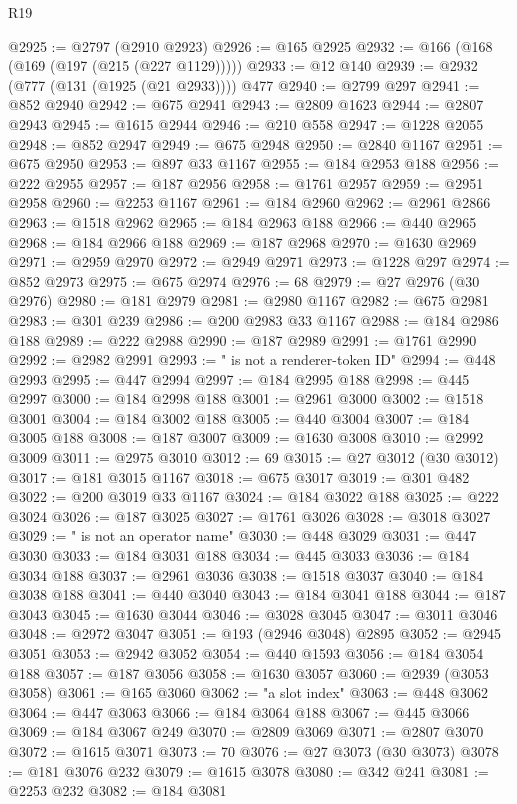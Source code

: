 \begin{lexlean}{R19}
\begin{coremodule}
@2925 := @2797 (@2910 @2923)
@2926 := @165 @2925
@2932 := @166 (@168 (@169 (@197 (@215 (@227 @1129)))))
@2933 := @12 @140
@2939 := @2932 (@777 (@131 (@1925 (@21 @2933)))) @477
@2940 := @2799 @297
@2941 := @852 @2940
@2942 := @675 @2941
@2943 := @2809 @1623
@2944 := @2807 @2943
@2945 := @1615 @2944
@2946 := @210 @558
@2947 := @1228 @2055
@2948 := @852 @2947
@2949 := @675 @2948
@2950 := @2840 @1167
@2951 := @675 @2950
@2953 := @897 @33 @1167
@2955 := @184 @2953 @188
@2956 := @222 @2955
@2957 := @187 @2956
@2958 := @1761 @2957
@2959 := @2951 @2958
@2960 := @2253 @1167
@2961 := @184 @2960
@2962 := @2961 @2866
@2963 := @1518 @2962
@2965 := @184 @2963 @188
@2966 := @440 @2965
@2968 := @184 @2966 @188
@2969 := @187 @2968
@2970 := @1630 @2969
@2971 := @2959 @2970
@2972 := @2949 @2971
@2973 := @1228 @297
@2974 := @852 @2973
@2975 := @675 @2974
@2976 := 68
@2979 := @27 @2976 (@30 @2976)
@2980 := @181 @2979
@2981 := @2980 @1167
@2982 := @675 @2981
@2983 := @301 @239
@2986 := @200 @2983 @33 @1167
@2988 := @184 @2986 @188
@2989 := @222 @2988
@2990 := @187 @2989
@2991 := @1761 @2990
@2992 := @2982 @2991
@2993 := " is not a renderer-token ID"
@2994 := @448 @2993
@2995 := @447 @2994
@2997 := @184 @2995 @188
@2998 := @445 @2997
@3000 := @184 @2998 @188
@3001 := @2961 @3000
@3002 := @1518 @3001
@3004 := @184 @3002 @188
@3005 := @440 @3004
@3007 := @184 @3005 @188
@3008 := @187 @3007
@3009 := @1630 @3008
@3010 := @2992 @3009
@3011 := @2975 @3010
@3012 := 69
@3015 := @27 @3012 (@30 @3012)
@3017 := @181 @3015 @1167
@3018 := @675 @3017
@3019 := @301 @482
@3022 := @200 @3019 @33 @1167
@3024 := @184 @3022 @188
@3025 := @222 @3024
@3026 := @187 @3025
@3027 := @1761 @3026
@3028 := @3018 @3027
@3029 := " is not an operator name"
@3030 := @448 @3029
@3031 := @447 @3030
@3033 := @184 @3031 @188
@3034 := @445 @3033
@3036 := @184 @3034 @188
@3037 := @2961 @3036
@3038 := @1518 @3037
@3040 := @184 @3038 @188
@3041 := @440 @3040
@3043 := @184 @3041 @188
@3044 := @187 @3043
@3045 := @1630 @3044
@3046 := @3028 @3045
@3047 := @3011 @3046
@3048 := @2972 @3047
@3051 := @193 (@2946 @3048) @2895
@3052 := @2945 @3051
@3053 := @2942 @3052
@3054 := @440 @1593
@3056 := @184 @3054 @188
@3057 := @187 @3056
@3058 := @1630 @3057
@3060 := @2939 (@3053 @3058)
@3061 := @165 @3060
@3062 := "a slot index"
@3063 := @448 @3062
@3064 := @447 @3063
@3066 := @184 @3064 @188
@3067 := @445 @3066
@3069 := @184 @3067 @249
@3070 := @2809 @3069
@3071 := @2807 @3070
@3072 := @1615 @3071
@3073 := 70
@3076 := @27 @3073 (@30 @3073)
@3078 := @181 @3076 @232
@3079 := @1615 @3078
@3080 := @342 @241
@3081 := @2253 @232
@3082 := @184 @3081

\end{coremodule}
\end{lexlean}
